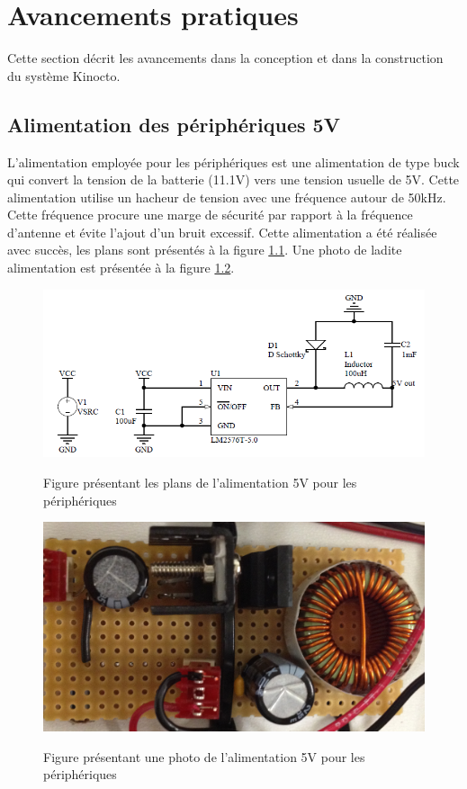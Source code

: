 


\chapter{Avancements pratiques}
\label{s:avancement}
Cette section décrit les avancements dans la conception et dans la construction du système Kinocto.
\section{Alimentation des périphériques 5V}
L'alimentation employée pour les périphériques est une alimentation de type buck qui convert la tension de la batterie (11.1V) vers une tension usuelle de 5V. Cette alimentation utilise un hacheur de tension avec une fréquence autour de 50kHz. Cette fréquence procure une marge de sécurité par rapport à la fréquence d'antenne et évite l'ajout d'un bruit excessif. Cette alimentation a été réalisée avec succès, les plans sont présentés à la figure \ref{fig:alim5V}. Une photo de ladite alimentation est présentée à la figure \ref{fig:alim5Vphoto}.

\begin{figure}[htbp]
\centering
\includegraphics[scale=0.5]{fig/alim_5V.png}
\label{fig:alim5V}
\caption{Figure présentant les plans de l'alimentation 5V pour les périphériques}
\end{figure}

\begin{figure}[htbp]
\centering
\includegraphics[scale=0.2]{fig/alim_5V_photo.png}
\label{fig:alim5Vphoto}
\caption{Figure présentant une photo de l'alimentation 5V pour les périphériques}
\end{figure}


